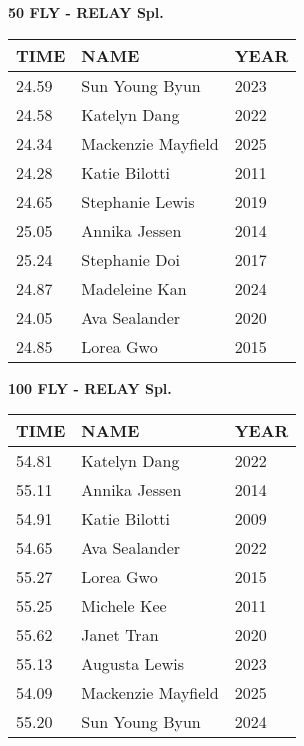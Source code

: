 \vspace{0.4cm}

\begin{center}
\begin{minipage}[t]{0.7\textwidth}
\centering
\textbf{50 FLY - RELAY Spl.}\\[0.05cm]
\begin{tabular}{@{}p{1.8cm}p{2.8cm}p{1.2cm}@{}}
\hline
\textbf{TIME} & \textbf{NAME} & \textbf{YEAR} \\
\hline
24.59 & Sun Young Byun & 2023 \\
24.58 & Katelyn Dang & 2022 \\
24.34 & Mackenzie Mayfield & 2025 \\
24.28 & Katie Bilotti & 2011 \\
24.65 & Stephanie Lewis & 2019 \\
25.05 & Annika Jessen & 2014 \\
25.24 & Stephanie Doi & 2017 \\
24.87 & Madeleine Kan & 2024 \\
24.05 & Ava Sealander & 2020 \\
24.85 & Lorea Gwo & 2015 \\
\hline
\end{tabular}
\end{minipage}
\end{center}

\vspace{0.4cm}

\begin{center}
\begin{minipage}[t]{0.7\textwidth}
\centering
\textbf{100 FLY - RELAY Spl.}\\[0.05cm]
\begin{tabular}{@{}p{1.8cm}p{2.8cm}p{1.2cm}@{}}
\hline
\textbf{TIME} & \textbf{NAME} & \textbf{YEAR} \\
\hline
54.81 & Katelyn Dang & 2022 \\
55.11 & Annika Jessen & 2014 \\
54.91 & Katie Bilotti & 2009 \\
54.65 & Ava Sealander & 2022 \\
55.27 & Lorea Gwo & 2015 \\
55.25 & Michele Kee & 2011 \\
55.62 & Janet Tran & 2020 \\
55.13 & Augusta Lewis & 2023 \\
54.09 & Mackenzie Mayfield & 2025 \\
55.20 & Sun Young Byun & 2024 \\
\hline
\end{tabular}
\end{minipage}
\end{center}

